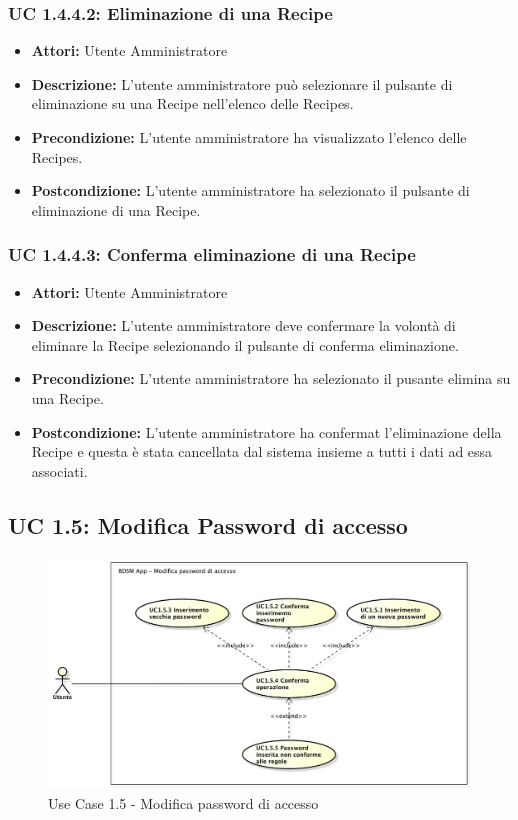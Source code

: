 \subsubsection{UC 1.4.4.2: Eliminazione di una Recipe}

\begin{itemize}
    \item \textbf{Attori:} Utente Amministratore
    \item \textbf{Descrizione:} L'utente amministratore può selezionare il pulsante di eliminazione su una Recipe nell'elenco delle Recipes.
    \item \textbf{Precondizione:} L'utente amministratore ha visualizzato l'elenco delle Recipes.
    \item \textbf{Postcondizione:} L'utente amministratore ha selezionato il pulsante di eliminazione di una Recipe.
\end{itemize}
\subsubsection{UC 1.4.4.3: Conferma eliminazione di una Recipe}

\begin{itemize}
    \item \textbf{Attori:} Utente Amministratore
    \item \textbf{Descrizione:} L'utente amministratore deve confermare la volontà di eliminare la Recipe selezionando il pulsante di conferma eliminazione.
    \item \textbf{Precondizione:} L'utente amministratore ha selezionato il pusante elimina su una Recipe.
    \item \textbf{Postcondizione:} L'utente amministratore ha confermat l'eliminazione della Recipe e questa è stata cancellata dal sistema insieme a tutti i dati ad essa associati.
\end{itemize}



\subsection{UC 1.5: Modifica Password di accesso}

\begin{figure}[!htbp]
    \centering
    \centerline{\includegraphics[scale=0.4]{./images/UC1_5.pdf}}
    \caption{Use Case 1.5 - Modifica password di accesso}
\end{figure}

